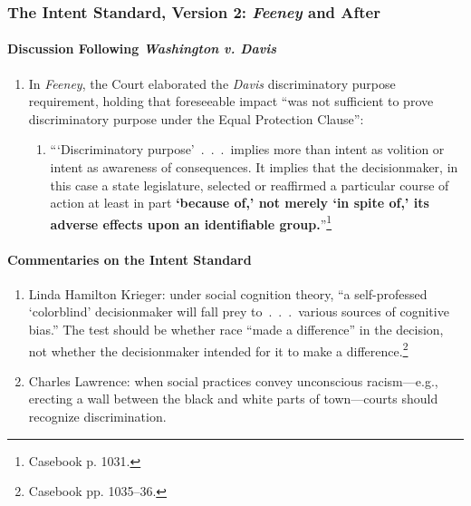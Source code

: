 \subsubsection{The Intent Standard, Version 2: \emph{Feeney} and After}

\paragraph{Discussion Following \emph{Washington v. Davis}}

\begin{enumerate}
    \item In \emph{Feeney}, the Court elaborated the \emph{Davis} 
    discriminatory purpose requirement, holding that foreseeable impact ``was 
    not sufficient to prove discriminatory purpose under the Equal Protection 
    Clause'':
    \begin{enumerate}
        \item \enquote{\enquote{Discriminatory purpose}~.~.~.~implies more 
        than intent as volition or intent as awareness of consequences. It 
        implies that the decisionmaker, in this case a state legislature, 
        selected or reaffirmed a particular course of action at least in part 
        \textbf{`because of,' not merely `in spite of,' its adverse effects 
        upon an identifiable group.}}\footnote{Casebook p. 1031.}
    \end{enumerate}
\end{enumerate}

\paragraph{Commentaries on the Intent Standard}

\begin{enumerate}
    \item Linda Hamilton Krieger: under social cognition theory, ``a 
    self-professed `colorblind' decisionmaker will fall prey to~.~.~.~various 
    sources of cognitive bias.'' The test should be whether race ``made a 
    difference'' in the decision, not whether the decisionmaker intended for 
    it to make a difference.\footnote{Casebook pp. 1035--36.}
    \item Charles Lawrence: when social practices convey unconscious 
    racism---e.g., erecting a wall between the black and white parts of 
    town---courts should recognize discrimination.
\end{enumerate}

